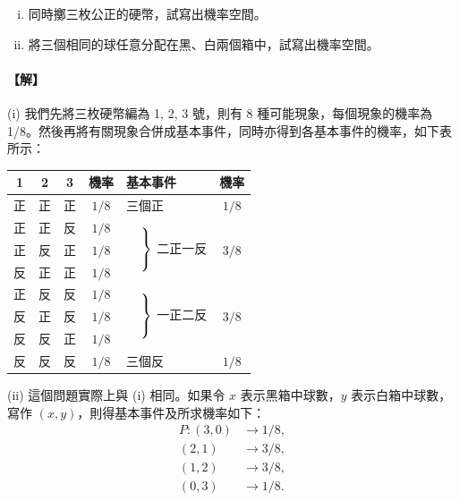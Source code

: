 \medskip
\begin{discussion}\label{disc:b5s-4-2}
\begin{enumerate}[(i), leftmargin=2em, itemsep=0.3em]
  \item 同時擲三枚公正的硬幣，試寫出機率空間。
  \item 將三個相同的球任意分配在黑、白兩個箱中，試寫出機率空間。
\end{enumerate}
\end{discussion}
\paragraph{【解】}
(i) 我們先將三枚硬幣編為 1, 2, 3 號，則有 8 種可能現象，每個現象的機率為 1/8。然後再將有關現象合併成基本事件，同時亦得到各基本事件的機率，如下表所示：

\begin{center}
\renewcommand{\arraystretch}{1.2}
\begin{tabular}{cccc|lc}
\hline\hline
1 & 2 & 3 & 機率 & 基本事件 & 機率 \\
\hline
正 & 正 & 正 & $1/8$ & \hphantom{$\Big\}$} 三個正 & $1/8$ \\
正 & 正 & 反 & $1/8$ & \multirow{3}{*}{$\left.\begin{array}{c} \vphantom{A}\\ \vphantom{A}\\ \vphantom{A}\end{array}\right\}$ 二正一反} & \multirow{3}{*}{$3/8$} \\
正 & 反 & 正 & $1/8$ & & \\
反 & 正 & 正 & $1/8$ & & \\
正 & 反 & 反 & $1/8$ & \multirow{3}{*}{$\left.\begin{array}{c} \vphantom{A}\\ \vphantom{A}\\ \vphantom{A}\end{array}\right\}$ 一正二反} & \multirow{3}{*}{$3/8$} \\
反 & 正 & 反 & $1/8$ & & \\
反 & 反 & 正 & $1/8$ & & \\
反 & 反 & 反 & $1/8$ & \hphantom{$\Big\}$} 三個反 & $1/8$ \\
\hline
\end{tabular}
\end{center}

(ii) 這個問題實際上與 (i) 相同。如果令 $x$ 表示黑箱中球數，$y$ 表示白箱中球數，寫作 $(x, y)$，則得基本事件及所求機率如下：
\begin{align*}
P \colon (3, 0) &\longrightarrow 1/8, \\
(2, 1) &\longrightarrow 3/8, \\
(1, 2) &\longrightarrow 3/8, \\
(0, 3) &\longrightarrow 1/8. \tag*{\#}
\end{align*}


